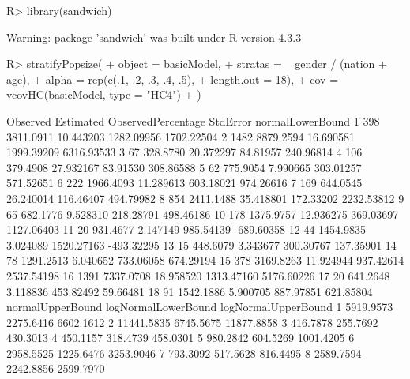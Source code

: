 \documentclass[
]{jss}
\newcommand{\1}{\mathcal{I}} \newcommand{\bx}{\boldsymbol{x}}
\begin{document}
\begin{CodeChunk}
\begin{CodeInput}
R> library(sandwich)
\end{CodeInput}
\begin{CodeOutput}
Warning: package 'sandwich' was built under R version 4.3.3
\end{CodeOutput}
\begin{CodeInput}
R> stratifyPopsize(
+   object  = basicModel,
+   stratas = ~ gender / (nation + age), 
+   alpha   = rep(c(.1, .2, .3, .4, .5), 
+                 length.out = 18),
+   cov     = vcovHC(basicModel, type = "HC4")
+ )
\end{CodeInput}
\begin{CodeOutput}
   Observed Estimated ObservedPercentage   StdError normalLowerBound
1       398 3811.0911          10.443203 1282.09956       1702.22504
2      1482 8879.2594          16.690581 1999.39209       6316.93533
3        67  328.8780          20.372297   84.81957        240.96814
4       106  379.4908          27.932167   83.91530        308.86588
5        62  775.9054           7.990665  303.01257        571.52651
6       222 1966.4093          11.289613  603.18021        974.26616
7       169  644.0545          26.240014  116.46407        494.79982
8       854 2411.1488          35.418801  172.33202       2232.53812
9        65  682.1776           9.528310  218.28791        498.46186
10      178 1375.9757          12.936275  369.03697       1127.06403
11       20  931.4677           2.147149  985.54139       -689.60358
12       44 1454.9835           3.024089 1520.27163       -493.32295
13       15  448.6079           3.343677  300.30767        137.35901
14       78 1291.2513           6.040652  733.06058        674.29194
15      378 3169.8263          11.924944  937.42614       2537.54198
16     1391 7337.0708          18.958520 1313.47160       5176.60226
17       20  641.2648           3.118836  453.82492         59.66481
18       91 1542.1886           5.900705  887.97851        621.85804
   normalUpperBound logNormalLowerBound logNormalUpperBound
1         5919.9573           2275.6416           6602.1612
2        11441.5835           6745.5675          11877.8858
3          416.7878            255.7692            430.3013
4          450.1157            318.4739            458.0301
5          980.2842            604.5269           1001.4205
6         2958.5525           1225.6476           3253.9046
7          793.3092            517.5628            816.4495
8         2589.7594           2242.8856           2599.7970

\end{CodeOutput}
\end{CodeChunk}
\end{document}
